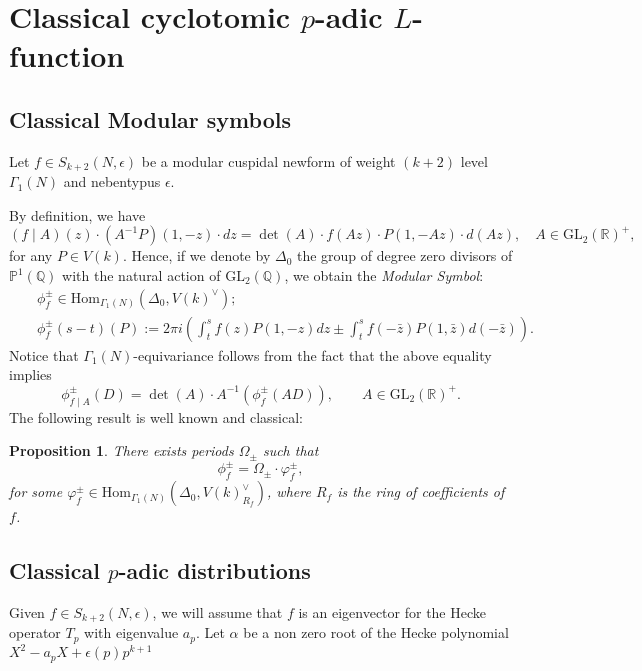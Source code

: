 \documentclass{amsart}
\newtheorem{prop0}[defn0]{Proposition}
\newenvironment{proposition}{\begin{prop0}}{\end{prop0}}
\newcommand{\GL}{{\mathrm{GL}}}
\newcommand{\Z}{{\mathbb Z}}
\newcommand{\Q}{{\mathbb Q}}
\newcommand{\R}{{\mathbb R}}
\newcommand{\PP}{{\mathbb P}}
\newcommand{\Hom}{{\mathrm {Hom}}}
\begin{document}
\section{Classical cyclotomic $p$-adic $L$-function}\label{Classical}

\subsection{Classical Modular symbols}

Let $f\in S_{k+2}(N,\epsilon)$ be a modular cuspidal newform of weight $(k+2)$ level $\Gamma_1(N)$ and nebentypus $\epsilon$. 

By definition, we have
\[
(f\mid A)(z)\cdot (A^{-1}P)(1,-z)\cdot dz=\det(A)\cdot f(Az)\cdot P(1,-Az)\cdot d(Az), \quad A\in \GL_2(\R)^+,
\]
for any $P\in V(k)$. Hence, if we denote by $\Delta_0$ the group of degree zero divisors of $\PP^1(\Q)$ with the natural action of $\GL_2(\Q)$, we obtain the \emph{Modular Symbol}:
\begin{eqnarray*}
&&\phi_f^{\pm}\in \Hom_{\Gamma_1(N)}(\Delta_0,V(k)^\vee);\\ 
&&\phi_f^{\pm}(s-t)(P):=2\pi i\left(\int_t^s f(z)P(1,-z)dz\pm\int_t^s f(-\bar z)P(1,\bar z)d(-\bar z)\right).
\end{eqnarray*}
Notice that $\Gamma_1(N)$-equivariance follows from the fact that the above equality implies
\begin{equation}\label{eqint}
\phi_{f\mid A}^\pm(D)=\det(A)\cdot A^{-1}\left(\phi_f^\pm(AD)\right),\qquad A\in\GL_2(\R)^+.
\end{equation}
The following result is well known and classical:
\begin{proposition}\label{ratMS}
There exists periods $\Omega_\pm$ such that
\[
\phi_f^\pm=\Omega_{\pm}\cdot\varphi_f^\pm,
\]
for some $\varphi_f^\pm\in  \Hom_{\Gamma_1(N)}(\Delta_0,V(k)_{R_f}^\vee)$, where $R_f$ is the ring of coefficients of $f$.
\end{proposition}


\subsection{Classical $p$-adic distributions}\label{classicdist}

Given $f\in S_{k+2}(N,\epsilon)$, we will assume that $f$ is an eigenvector for the Hecke operator $T_p$ with eigenvalue $a_p$. %
Let $\alpha$ be a non zero root of the Hecke polynomial $X^2-a_pX+\epsilon(p)p^{k+1}$%
\end{document}
